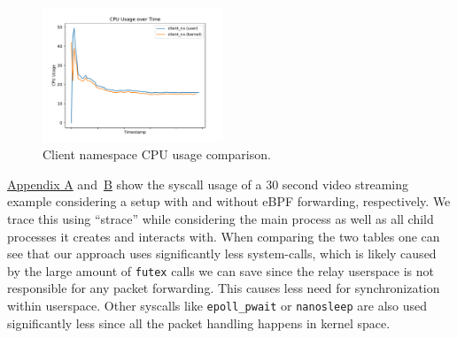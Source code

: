 \begin{figure}[H]
\begin{minipage}{0.48\textwidth}
    \end{minipage}\hfill
    \begin{minipage}{\textwidth}
        \centering
        \includegraphics[width=0.48\textwidth]{figures/04_testing_and_results/cpu_usage_client_ns.pdf}
        \caption[Client CPU usage comparison]{Client namespace CPU usage comparison.}\label{fig:cpu-utilization-client}
    \end{minipage}
\end{figure}



\hyperref[chap:appendix-fast-relay]{Appendix A} and~\hyperref[chap:appendix-plain-relay]{B} show 
the syscall usage of a 30 second video streaming example considering a setup with and without eBPF 
forwarding, respectively.
We trace this using ``strace'' while considering the main process as well as all child processes
it creates and interacts with.
When comparing the two tables one can see that our approach uses significantly less system-calls, 
which is likely caused by the large amount of \verb|futex| calls we can save since the relay userspace is not 
responsible for any packet forwarding.
This causes less need for synchronization within userspace.
Other syscalls like \verb|epoll_pwait| or \verb|nanosleep| are also used significantly less since all the 
packet handling happens in kernel space.

